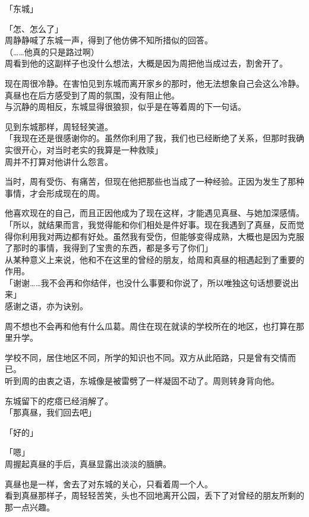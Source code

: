 「东城」

「怎、怎么了」\\

周静静喊了东城一声，得到了他仿佛不知所措似的回答。\\

（……他真的只是路过啊）\\

周看到他的这副样子也没什么想法，大概是因为周把他当成过去，割舍开了。

现在周很冷静。在害怕见到东城而离开家乡的那时，他无法想象自己会这么冷静。真昼也在后方感受到了周的氛围，没有阻止他。\\

与沉静的周相反，东城显得很狼狈，似乎是在等着周的下一句话。

见到东城那样，周轻轻笑道。\\

「我现在还是很感谢你的。虽然你利用了我，我们也已经断绝了关系，但那时我确实很开心，对当时老实的我算是一种救赎」\\

周并不打算对他讲什么怨言。

当时，周有受伤、有痛苦，但现在他把那些也当成了一种经验。正因为发生了那种事情，才会形成现在的周。

他喜欢现在的自己，而且正因他成为了现在这样，才能遇见真昼、与她加深感情。\\

「所以，就结果而言，我觉得能和你们相处是件好事。现在我遇到了真昼，反而觉得你利用我对两边都有好处。虽然我有受伤，但能够变得成熟，大概也是因为克服了那时的事情，我得到了宝贵的东西，都是多亏了你们」\\

从某种意义上来说，他和不在这里的曾经的朋友，给周和真昼的相遇起到了重要的作用。\\

「谢谢……我不会再和你结伴，也没什么事要和你说了，所以唯独这句话想要说出来」\\

感谢之语，亦为诀别。

周不想也不会再和他有什么瓜葛。周住在现在就读的学校所在的地区，也打算在那里升学。

学校不同，居住地区不同，所学的知识也不同。双方从此陌路，只是曾有交情而已。\\

听到周的由衷之语，东城像是被雷劈了一样凝固不动了。周则转身背向他。

东城留下的疙瘩已经消解了。\\

「那真昼，我们回去吧」

「好的」

「嗯」\\

周握起真昼的手后，真昼显露出淡淡的腼腆。

真昼也是一样，舍去了对东城的关心，只看着周一个人。\\

看到真昼那样子，周轻轻苦笑，头也不回地离开公园，丢下了对曾经的朋友所剩的那一点兴趣。
